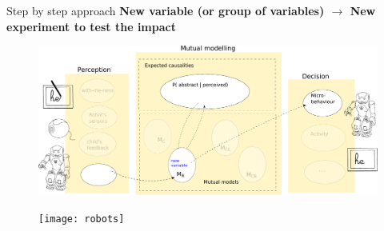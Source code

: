 \documentclass[compress]{beamer}
\begin{document}
\begin{frame}{Step by step approach}
\textbf{New variable (or group of variables) $\rightarrow$ New experiment to test the impact}
	\begin{figure}
        \centering
        \includegraphics[width=1\columnwidth]{archi_newstep}
    \end{figure}
\end{frame}

\begin{frame}
	\begin{figure}
        \centering
        \texttt{[image: robots]}
    \end{figure}
\end{frame}
\end{document}
